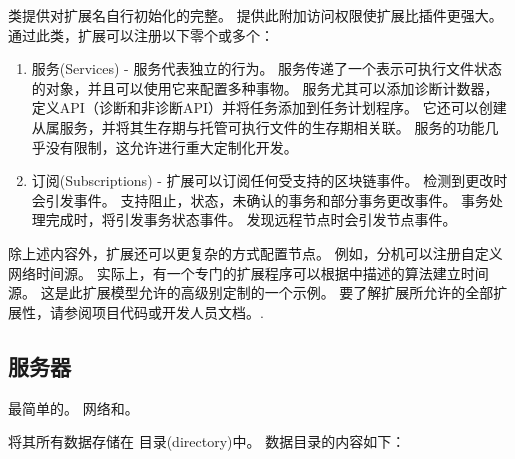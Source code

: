  类提供对扩展名自行初始化的完整。
提供此附加访问权限使扩展比插件更强大。
通过此类，扩展可以注册以下零个或多个：

\begin{enumerate}
	\item{服务(Services) -
		服务代表独立的行为。
		服务传递了一个表示可执行文件状态的对象，并且可以使用它来配置多种事物。
		服务尤其可以添加诊断计数器，定义API（诊断和非诊断API）并将任务添加到任务计划程序。
		它还可以创建从属服务，并将其生存期与托管可执行文件的生存期相关联。
		服务的功能几乎没有限制，这允许进行重大定制化开发。
	}
	\item{订阅(Subscriptions) -
		扩展可以订阅任何受支持的区块链事件。
		检测到更改时会引发事件。
		支持阻止，状态，未确认的事务和部分事务更改事件。
		事务处理完成时，将引发事务状态事件。
		发现远程节点时会引发节点事件。
	}
\end{enumerate}

除上述内容外，扩展还可以更复杂的方式配置节点。
例如，分机可以注册自定义网络时间源。
实际上，有一个专门的扩展程序可以根据中描述的算法建立时间源。
这是此扩展模型允许的高级别定制的一个示例。
要了解扩展所允许的全部扩展性，请参阅项目代码或开发人员文档。\nemtechdocsfootnote{}.

\subsection{服务器}

最简单的。
网络和。

\codenamespace 将其所有数据存储在  目录(directory)中。
数据目录的内容如下：

